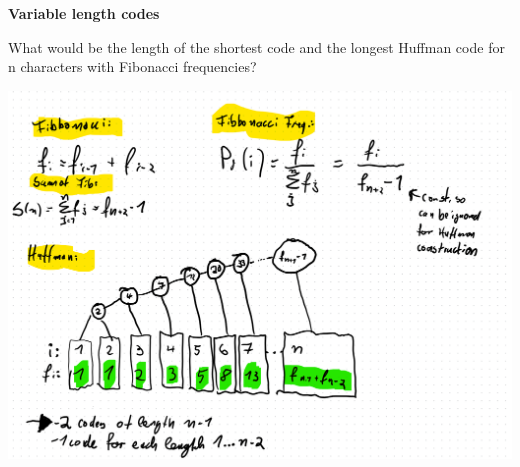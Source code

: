 \question \textbf{Variable length codes}

What would be the length of the shortest code and the longest Huffman code for n characters with Fibonacci frequencies?


\begin{solution}

    
    \includegraphics[width=0.8\linewidth]{task_2/solution_a2.png}
\end{solution}
